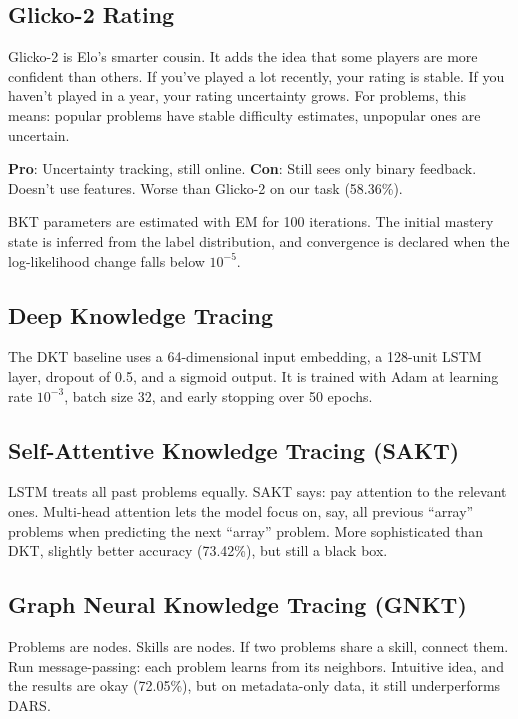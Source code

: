 \documentclass[conference]{IEEEtran}
\begin{document}
\subsection{Glicko-2 Rating}

Glicko-2 is Elo's smarter cousin. It adds the idea that some players are more confident than others. If you've played a lot recently, your rating is stable. If you haven't played in a year, your rating uncertainty grows. For problems, this means: popular problems have stable difficulty estimates, unpopular ones are uncertain.

\textbf{Pro}: Uncertainty tracking, still online.
\textbf{Con}: Still sees only binary feedback. Doesn't use features. Worse than Glicko-2 on our task (58.36\%).

BKT parameters are estimated with EM for 100 iterations. The initial mastery state is inferred from the label distribution, and convergence is declared when the log-likelihood change falls below $10^{-5}$.

\subsection{Deep Knowledge Tracing}

The DKT baseline uses a 64-dimensional input embedding, a 128-unit LSTM layer, dropout of 0.5, and a sigmoid output. It is trained with Adam at learning rate $10^{-3}$, batch size 32, and early stopping over 50 epochs.

\subsection{Self-Attentive Knowledge Tracing (SAKT)}

LSTM treats all past problems equally. SAKT says: pay attention to the relevant ones. Multi-head attention lets the model focus on, say, all previous ``array'' problems when predicting the next ``array'' problem. More sophisticated than DKT, slightly better accuracy (73.42\%), but still a black box.

\subsection{Graph Neural Knowledge Tracing (GNKT)}

Problems are nodes. Skills are nodes. If two problems share a skill, connect them. Run message-passing: each problem learns from its neighbors. Intuitive idea, and the results are okay (72.05\%), but on metadata-only data, it still underperforms DARS.
\end{document}
